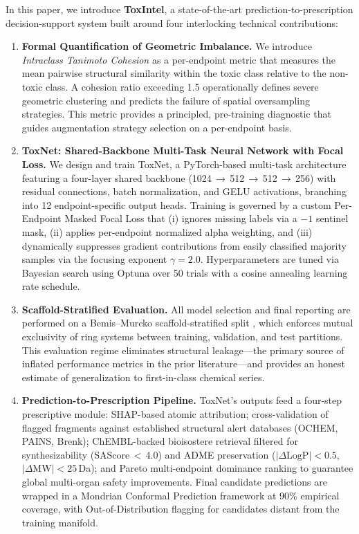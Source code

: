 \documentclass[lettersize,journal]{IEEEtran}
\begin{document}
In this paper, we introduce \textbf{ToxIntel}, a state-of-the-art
prediction-to-prescription decision-support system built around four
interlocking technical contributions:

\begin{enumerate}

\item \textbf{Formal Quantification of Geometric Imbalance.}
We introduce \textit{Intraclass Tanimoto Cohesion} as a per-endpoint metric
that measures the mean pairwise structural similarity within the toxic class
relative to the non-toxic class.
A cohesion ratio exceeding 1.5 operationally defines severe geometric
clustering and predicts the failure of spatial oversampling strategies.
This metric provides a principled, pre-training diagnostic that guides
augmentation strategy selection on a per-endpoint basis.

\item \textbf{ToxNet: Shared-Backbone Multi-Task Neural Network with Focal Loss.}
We design and train ToxNet, a PyTorch-based multi-task architecture featuring
a four-layer shared backbone (1024\,$\rightarrow$\,512\,$\rightarrow$\,512\,$\rightarrow$\,256)
with residual connections, batch normalization, and GELU activations, branching
into 12 endpoint-specific output heads.
Training is governed by a custom Per-Endpoint Masked Focal Loss
\cite{lin2017focal} that (i) ignores missing labels via a $-1$ sentinel mask,
(ii) applies per-endpoint normalized alpha weighting, and (iii) dynamically
suppresses gradient contributions from easily classified majority samples via
the focusing exponent $\gamma = 2.0$.
Hyperparameters are tuned via Bayesian search using Optuna over 50 trials with
a cosine annealing learning rate schedule.

\item \textbf{Scaffold-Stratified Evaluation.}
All model selection and final reporting are performed on a Bemis--Murcko
scaffold-stratified split \cite{bemis1996}, which enforces mutual exclusivity
of ring systems between training, validation, and test partitions.
This evaluation regime eliminates structural leakage---the primary source of
inflated performance metrics in the prior literature---and provides an honest
estimate of generalization to first-in-class chemical series.

\item \textbf{Prediction-to-Prescription Pipeline.}
ToxNet's outputs feed a four-step prescriptive module:
SHAP-based atomic attribution; cross-validation of flagged fragments against
established structural alert databases (OCHEM, PAINS, Brenk); ChEMBL-backed
bioisostere retrieval filtered for synthesizability (SAScore\,$<$\,4.0) and
ADME preservation ($|\Delta\text{LogP}| < 0.5$, $|\Delta\text{MW}| < 25$\,Da);
and Pareto multi-endpoint dominance ranking to guarantee global multi-organ
safety improvements.
Final candidate predictions are wrapped in a Mondrian Conformal Prediction
framework \cite{vovk2005} at 90\% empirical coverage, with Out-of-Distribution
flagging for candidates distant from the training manifold.
\end{enumerate}
\end{document}
